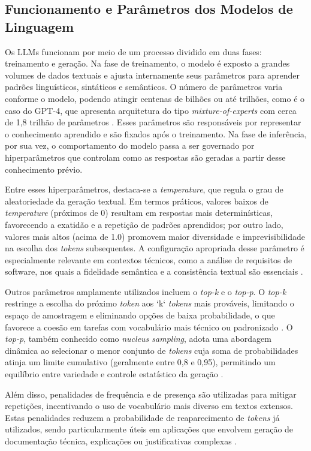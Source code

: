 \subsection{Funcionamento e Parâmetros dos Modelos de Linguagem}

Os LLMs funcionam por meio de um processo dividido em duas fases: treinamento e geração. Na fase de treinamento, o modelo é exposto a grandes volumes de dados textuais e ajusta internamente seus parâmetros para aprender padrões linguísticos, sintáticos e semânticos. O número de parâmetros varia conforme o modelo, podendo atingir centenas de bilhões ou até trilhões, como é o caso do GPT-4, que apresenta arquitetura do tipo \textit{mixture-of-experts} com cerca de 1,8 trilhão de parâmetros . Esses parâmetros são responsáveis por representar o conhecimento aprendido e são fixados após o treinamento. Na fase de inferência, por sua vez, o comportamento do modelo passa a ser governado por hiperparâmetros que controlam como as respostas são geradas a partir desse conhecimento prévio.

Entre esses hiperparâmetros, destaca-se a \textit{temperature}, que regula o grau de aleatoriedade da geração textual. Em termos práticos, valores baixos de \textit{temperature} (próximos de 0) resultam em respostas mais determinísticas, favorecendo a exatidão e a repetição de padrões aprendidos; por outro lado, valores mais altos (acima de 1.0) promovem maior diversidade e imprevisibilidade na escolha dos \textit{tokens} subsequentes. A configuração apropriada desse parâmetro é especialmente relevante em contextos técnicos, como a análise de requisitos de software, nos quais a fidelidade semântica e a consistência textual são essenciais .

Outros parâmetros amplamente utilizados incluem o \textit{top-k} e o \textit{top-p}. O \textit{top-k} restringe a escolha do próximo \textit{token} aos `k` \textit{tokens} mais prováveis, limitando o espaço de amostragem e eliminando opções de baixa probabilidade, o que favorece a coesão em tarefas com vocabulário mais técnico ou padronizado . O \textit{top-p}, também conhecido como \textit{nucleus sampling}, adota uma abordagem dinâmica ao selecionar o menor conjunto de \textit{tokens} cuja soma de probabilidades atinja um limite cumulativo (geralmente entre 0,8 e 0,95), permitindo um equilíbrio entre variedade e controle estatístico da geração .

Além disso, penalidades de frequência e de presença são utilizadas para mitigar repetições, incentivando o uso de vocabulário mais diverso em textos extensos. Estas penalidades reduzem a probabilidade de reaparecimento de \textit{tokens} já utilizados, sendo particularmente úteis em aplicações que envolvem geração de documentação técnica, explicações ou justificativas complexas .

